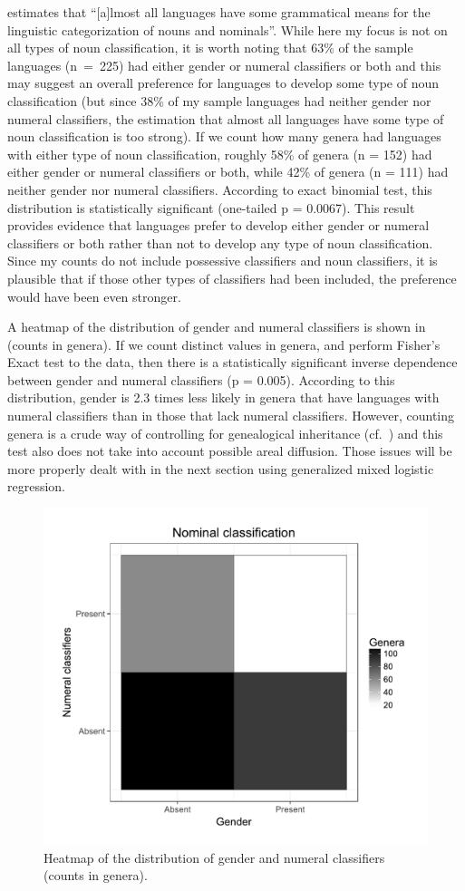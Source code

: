 \documentclass[output=collectionpaper]{langsci/langscibook}
\begin{document}
\citet[1]{Aikhenvald2000} estimates that ``[a]lmost all languages have some grammatical means for the linguistic categorization of nouns and nominals''. While here my focus is not on all types of noun classification, it is worth noting that 63\% of the sample languages (n~=~225) had either gender or numeral classifiers or both and this may suggest an overall preference for languages to develop some type of noun classification (but since 38\% of my sample languages had neither gender nor numeral classifiers, the estimation that almost all languages have some type of noun classification is too strong). If we count how many genera had languages with either type of noun classification, roughly 58\% of genera (n = 152) had either gender or numeral classifiers or both, while 42\% of genera (n = 111) had neither gender nor numeral classifiers. According to exact binomial test, this distribution is statistically significant (one-tailed p = 0.0067). This result provides evidence that languages prefer to develop either gender or numeral classifiers or both rather than not to develop any type of noun classification. Since my counts do not include possessive classifiers and noun classifiers, it is plausible that if those other types of classifiers had been included, the preference would have been even stronger.

A heatmap of the distribution of gender and numeral classifiers is shown in  (counts in genera). If we count distinct values in genera, and perform Fisher's Exact test to the data, then there is a statistically significant inverse dependence between gender and numeral classifiers (p = 0.005). According to this distribution, gender is 2.3 times less likely in genera that have languages with numeral classifiers than in those that lack numeral classifiers. However, counting genera is a crude way of controlling for genealogical inheritance (cf.\ ) and this test also does not take into account possible areal diffusion. Those issues will be more properly dealt with in the next section using generalized mixed logistic regression.

\begin{figure}
\includegraphics[width=.6\textwidth]{figures/13/Fig3_heatmap}
\caption{%
Heatmap of the distribution of gender and numeral classifiers (counts in genera).
}%
\label{fig:Sinne:3}
\end{figure}
\end{document}

